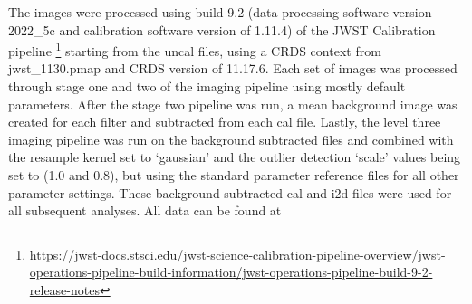 \documentclass[twocolumn]{aastex631}
\newcommand{\wdA}{WD\,1202$-$232}
\newcommand{\wdB}{WD\,2105$-$82}
\begin{document}
The images were processed using build 9.2 (data processing software version 2022\_5c and calibration software version of 1.11.4) of the JWST Calibration pipeline 
\footnote{\url{https://jwst-docs.stsci.edu/jwst-science-calibration-pipeline-overview/jwst-operations-pipeline-build-information/jwst-operations-pipeline-build-9-2-release-notes}} starting from the uncal files, using a CRDS context from jwst\_1130.pmap and CRDS version of 11.17.6. Each set of images was processed through stage one and two of the imaging pipeline using mostly default parameters. After the stage two pipeline was run, a mean background image was created for each filter and subtracted from each cal file. Lastly, the level three imaging pipeline was run on the background subtracted files and combined with the resample kernel set to `gaussian' and the outlier detection `scale' values being set to (1.0 and 0.8), but using the standard parameter reference files for all other parameter settings. These background subtracted cal and i2d files were used for all subsequent analyses. All data can be found at 

    \label{tab:wdobsparams}
\end{document}
